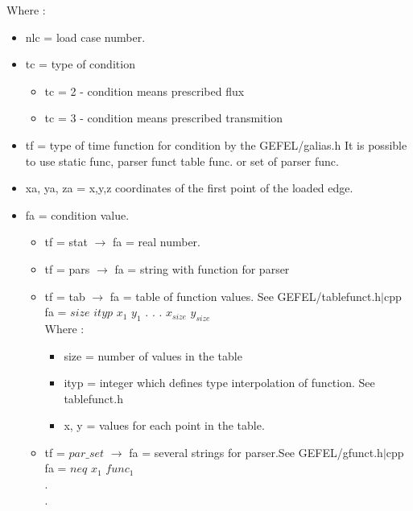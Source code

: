\documentclass[12pt]{book}
\begin{document}
\begin{itemize}
           Where :
           \begin{itemize}
           \item nlc = load case number.
           \item tc  = type of condition
                 \begin{itemize}
                 \item tc = 2  - condition means prescribed flux
                 \item tc = 3  - condition means prescribed transmition
                 \end{itemize}
           \item tf  = type of time function for condition by the GEFEL/galias.h
                 It is possible to use static func, parser funct table func. or
                 set of parser func.
           \item xa, ya, za = x,y,z coordinates of the first point of the loaded edge.
           \item fa  = condition value.
                 \begin{itemize}
                 \item tf = stat $\to$ fa = real number.
                 \item tf = pars $\to$ fa = string with function for parser
                 \item tf = tab  $\to$ fa = table of function values. See GEFEL/tablefunct.h$\mid$cpp\\
                      fa = $size$ $ityp$ $x_1$ $y_1$ . . . $x_{size}$ $y_{size}$\\
                      Where :
                      \begin{itemize}
                      \item size = number of values in the table
                      \item ityp = integer which defines type interpolation of
                             function. See tablefunct.h
                      \item x, y = values for each point in the table.
                      \end{itemize}
                 \item tf = $par\_set$ $\to$ fa = several strings for parser.See GEFEL/gfunct.h$\mid$cpp\\
                 fa = $neq$ $x_1$ $func_1$\\
                           .\\
                           .\\

\end{itemize}
\end{itemize}
\end{itemize}
\end{document}

